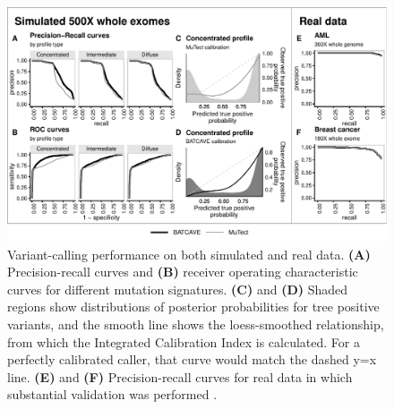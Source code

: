 \documentclass[a4,center,fleqn]{NAR}
\begin{document}

  \begin{figure}
    \begin{center}
    \includegraphics[width=\textwidth]{figures/fig_wes.pdf}
    \end{center}
    \caption{Variant-calling performance on both simulated and real data.
    \textbf{(A)} Precision-recall curves and \textbf{(B)} receiver operating characteristic curves for different mutation signatures.
    \textbf{(C)} and \textbf{(D)} Shaded regions show distributions of posterior probabilities for tree positive variants, and the smooth line shows the loess-smoothed relationship, from which the Integrated Calibration Index is calculated. For a perfectly calibrated caller, that curve would match the dashed y=x line. 
    \textbf{(E)} and \textbf{(F)} Precision-recall curves for real data in which substantial validation was performed \cite{Griffith2015,Shi2018}.
}
  \label{NAR-wes_fig}
  \end{figure}
  
\end{document}
